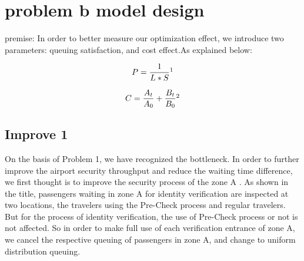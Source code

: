 \section{problem b model design}
premise: In order to better measure our optimization effect, we introduce two parameters: queuing satisfaction, and cost effect.As explained below:

\begin{equation}
\left.
\begin{aligned}[b]
  P = \frac{1}{L*S}\footnotemark[1]
\end{aligned}
\right.
\end{equation}

\begin{equation}
\left.
\begin{aligned}[b]
  C=\frac{A_{t}}{A_{0}}+\frac{B_{t}}{B_{0}}
  \footnotemark[2]
\end{aligned}
\right.
\end{equation}



\subsection{Improve 1}
On the basis of Problem 1, we have recognized the bottleneck. In order to further improve the airport security throughput and reduce the waiting time difference, we first thought is to improve the security process of the zone A . As shown in the title, passengers waiting in zone A for identity verification are inspected at two locations, the travelers using the Pre-Check process and regular travelers. But for the process of identity verification, the use of Pre-Check process or not is not affected. So in order to make full use of each verification entrance of zone A, we cancel the respective queuing of passengers in zone A, and change to uniform distribution queuing.

